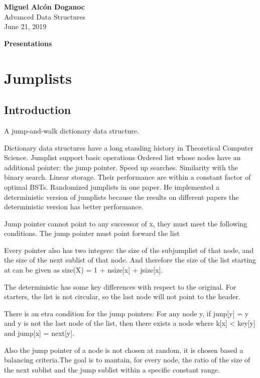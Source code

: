 \documentclass[a4paper, 10pt]{article}
\begin{document}
\noindent
\begin{flushright}
    \large\textbf{Miguel Alcón Doganoc} \\
    Advanced Data Structures \\
	June 21, 2019
\end{flushright}

\noindent
{\huge{\textbf{Presentations}}}
\section{Jumplists}
\subsection{Introduction}
A jump-and-walk dictionary data structure.

Dictionary data structures have a long standing history in Theoretical Computer Science. 
Jumplist support basic operations
Ordered list whose nodes have an additional pointer: the jump pointer. Speed up searches. Similarity with the binary search. Linear storage. Their performance are within a constant factor of optimal BSTs.
Randomized jumplists in one paper. He implemented a deterministic version of jumplists because the results on different papers the deterministic version has better performance.

Jump pointer cannot point to any successor of x, they must meet the following conditions. The jump pointer must point forward the list

Every pointer also has two integers: the size of the subjumplist of that node, and the size of the next sublist of that node. And therefore the size of the list starting at  can be given as size(X) = 1 + nsize[x] + jsize[x].

The deterministic has some key differences with respect to the original. For starters, the list is not circular, so the last node will not point to the header.

There is an etra condition for the jump pointers: For any node y, if junp[y] = y and y is not the last node of the list, then there exists a node where k[x] < key[y] and jump[x] = next[y].

Also the jump pointer of a node is not chosen at random, it is chosen based a balancing criteria.The goal is to mantain, for every node, the ratio of the size of the next sublist and the jump sublist within a specific constant range.
\end{document}
